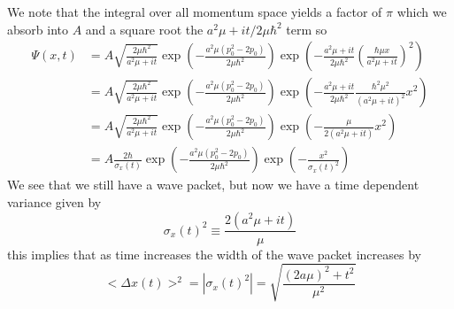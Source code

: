 \documentclass[11pt]{article}
\numberwithin{equation}{section}
\begin{document}
We note that the integral over all momentum space yields a factor of $\pi$ which we absorb into $A$ and a square root the 
$a^2\mu +it/2\mu\hbar^2$ term so 
\begin{align*}
\Psi(x,t) &= A\sqrt{\frac{2\mu\hbar^2}{a^2\mu+it}}\exp\left(-\frac{a^2\mu(p_0^2-2p_0)}{2\mu\hbar^2}\right)\exp\left(-\frac{a^2\mu+it}{2\mu\hbar^2}\left(\frac{\hbar\mu x}{a^2\mu +it}\right)^2\right)\\
&= A\sqrt{\frac{2\mu\hbar^2}{a^2\mu+it}}\exp\left(-\frac{a^2\mu(p_0^2-2p_0)}{2\mu\hbar^2}\right)\exp\left(-\frac{a^2\mu+it}{2\mu\hbar^2}\frac{\hbar^2\mu^2}{(a^2\mu +it)^2}x^2\right)\\
&= A\sqrt{\frac{2\mu\hbar^2}{a^2\mu+it}}\exp\left(-\frac{a^2\mu(p_0^2-2p_0)}{2\mu\hbar^2}\right)\exp\left(-\frac{\mu}{2(a^2\mu +it)}x^2\right)\\
&= A\frac{2\hbar}{\sigma_x(t)}\exp\left(-\frac{a^2\mu(p_0^2-2p_0)}{2\mu\hbar^2}\right)\exp\left(-\frac{x^2}{\sigma_x(t)^2}\right)
\end{align*}
We see that we still have a wave packet, but now we have a time dependent variance given by 
$$\sigma_x(t)^2 \equiv \frac{2(a^2\mu+it)}{\mu}$$
this implies that as time increases the width of the wave packet increases by 
$$<\Delta x(t)>^2 = |\sigma_x(t)^2| = \sqrt{\frac{(2a\mu)^2+t^2}{\mu^2}}$$
\end{document}
